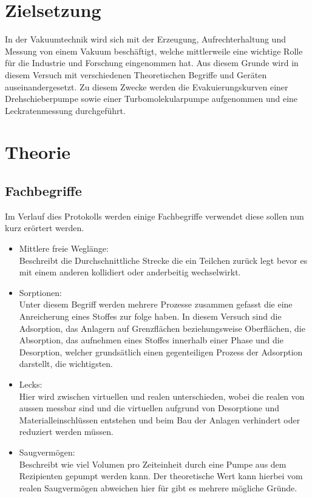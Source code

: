 \section{Zielsetzung}
In der Vakuumtechnik wird sich mit der Erzeugung, Aufrechterhaltung und Messung von einem Vakuum beschäftigt,
welche mittlerweile eine wichtige Rolle für die Industrie und Forschung eingenommen hat. Aus diesem Grunde wird
in diesem Versuch mit verschiedenen Theoretischen Begriffe und Geräten auseinandergesetzt. Zu diesem Zwecke werden
die Evakuierungskurven einer Drehschieberpumpe sowie einer Turbomolekularpumpe aufgenommen und eine Leckratenmessung 
durchgeführt.

\section{Theorie}
\label{sec:Theorie}

\subsection{Fachbegriffe}
Im Verlauf dies Protokolls werden einige Fachbegriffe verwendet diese sollen nun kurz erörtert werden.
\begin{itemize}
    \item Mittlere freie Weglänge: \\
    Beschreibt die Durchschnittliche Strecke die ein Teilchen zurück legt bevor es mit einem anderen kollidiert oder anderbeitig 
    wechselwirkt.

    \item Sorptionen: \\
    Unter diesem Begriff werden mehrere Prozesse zusammen gefasst die eine Anreicherung eines Stoffes zur folge haben. In diesem 
    Versuch sind die Adsorption, das Anlagern auf Grenzflächen beziehungsweise Oberflächen, die Absorption, das aufnehmen eines 
    Stoffes innerhalb einer Phase und die Desorption, welcher grundsätlich einen gegenteiligen Prozess der Adsorption darstellt, die wichtigsten.

    \item Lecks: \\
    Hier wird zwischen virtuellen und realen unterschieden, wobei die realen von aussen messbar sind und die virtuellen aufgrund 
    von Desorptione und Materialleinschlüssen entstehen und beim Bau der Anlagen verhindert oder reduziert werden müssen.

    \item Saugvermögen:\\
    Beschreibt wie viel Volumen pro Zeiteinheit durch eine Pumpe aus dem Rezipienten gepumpt werden kann. Der theoretische Wert kann 
    hierbei vom realen Saugvermögen abweichen hier für gibt es mehrere mögliche Gründe.
\end{itemize}

